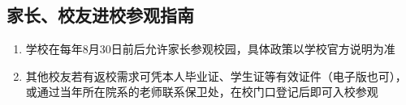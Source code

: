\subsection[家长、校友进校参观指南]{家长、校友进校参观指南\footnotemark}
\begin{enumerate}
    \item 学校在每年8月30日前后允许家长参观校园\footnotemark，具体政策以学校官方说明为准
    \item 其他校友若有返校需求可凭本人毕业证、学生证等有效证件（电子版也可），或通过当年所在院系的老师联系保卫处，在校门口登记后即可入校参观
\end{enumerate}